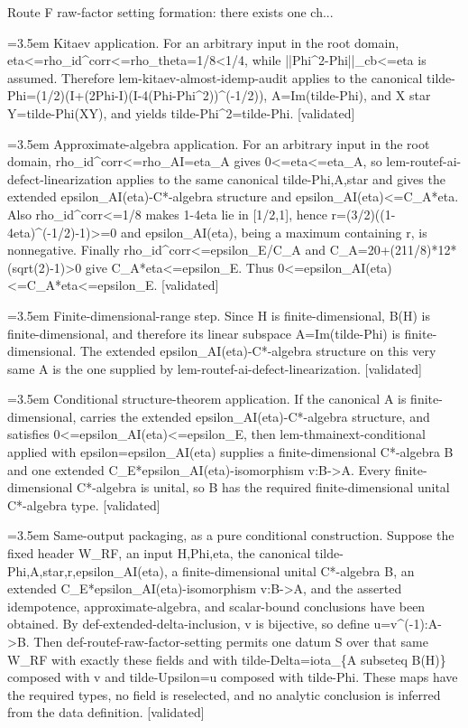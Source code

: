 \documentclass{article}
\newcommand{\step}[1]{\par\noindent\hangindent=3.5em\hangafter=1%
  \makebox[3.5em][l]{\textbf{#1.}}}
\newcommand{\steptag}[1]{\hfill{\small\textsf{[#1]}}}
\begin{document}
\begin{proofbox}{Route F raw-factor setting formation: there exists one ch...}
\step{1.4} Kitaev application. For an arbitrary input in the root domain, eta<=rho\_id\textasciicircum{}corr<=rho\_theta=1/8<1/4, while ||Phi\textasciicircum{}2-Phi||\_cb<=eta is assumed. Therefore lem-kitaev-almost-idemp-audit applies to the canonical tilde-Phi=(1/2)(I+(2Phi-I)(I-4(Phi-Phi\textasciicircum{}2))\textasciicircum{}(-1/2)), A=Im(tilde-Phi), and X star Y=tilde-Phi(XY), and yields tilde-Phi\textasciicircum{}2=tilde-Phi. \steptag{validated} \\[4pt]
\step{1.5} Approximate-algebra application. For an arbitrary input in the root domain, rho\_id\textasciicircum{}corr<=rho\_AI=eta\_A gives 0<=eta<=eta\_A, so lem-routef-ai-defect-linearization applies to the same canonical tilde-Phi,A,star and gives the extended epsilon\_AI(eta)-C*-algebra structure and epsilon\_AI(eta)<=C\_A*eta. Also rho\_id\textasciicircum{}corr<=1/8 makes 1-4eta lie in [1/2,1], hence r=(3/2)((1-4eta)\textasciicircum{}(-1/2)-1)>=0 and epsilon\_AI(eta), being a maximum containing r, is nonnegative. Finally rho\_id\textasciicircum{}corr<=epsilon\_E/C\_A and C\_A=20+(211/8)*12*(sqrt(2)-1)>0 give C\_A*eta<=epsilon\_E. Thus 0<=epsilon\_AI(eta)<=C\_A*eta<=epsilon\_E. \steptag{validated} \\[4pt]
\step{1.6} Finite-dimensional-range step. Since H is finite-dimensional, B(H) is finite-dimensional, and therefore its linear subspace A=Im(tilde-Phi) is finite-dimensional. The extended epsilon\_AI(eta)-C*-algebra structure on this very same A is the one supplied by lem-routef-ai-defect-linearization. \steptag{validated} \\[4pt]
\step{1.7} Conditional structure-theorem application. If the canonical A is finite-dimensional, carries the extended epsilon\_AI(eta)-C*-algebra structure, and satisfies 0<=epsilon\_AI(eta)<=epsilon\_E, then lem-thmainext-conditional applied with epsilon=epsilon\_AI(eta) supplies a finite-dimensional C*-algebra B and one extended C\_E*epsilon\_AI(eta)-isomorphism v:B->A. Every finite-dimensional C*-algebra is unital, so B has the required finite-dimensional unital C*-algebra type. \steptag{validated} \\[4pt]
\step{1.8} Same-output packaging, as a pure conditional construction. Suppose the fixed header W\_RF, an input H,Phi,eta, the canonical tilde-Phi,A,star,r,epsilon\_AI(eta), a finite-dimensional unital C*-algebra B, an extended C\_E*epsilon\_AI(eta)-isomorphism v:B->A, and the asserted idempotence, approximate-algebra, and scalar-bound conclusions have been obtained. By def-extended-delta-inclusion, v is bijective, so define u=v\textasciicircum{}(-1):A->B. Then def-routef-raw-factor-setting permits one datum S over that same W\_RF with exactly these fields and with tilde-Delta=iota\_\{A subseteq B(H)\} composed with v and tilde-Upsilon=u composed with tilde-Phi. These maps have the required types, no field is reselected, and no analytic conclusion is inferred from the data definition. \steptag{validated} \\[4pt]

\end{proofbox}
\end{document}
